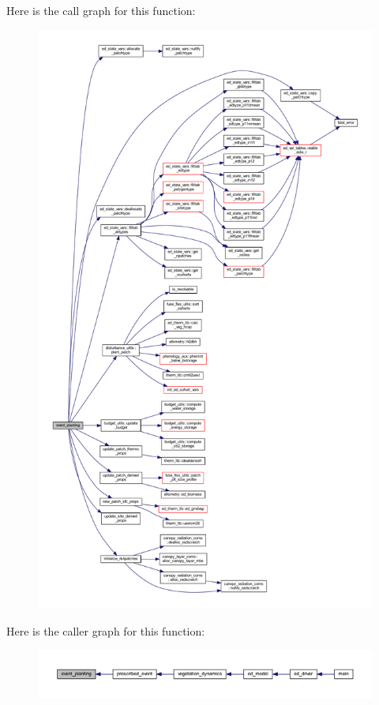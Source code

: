 Here is the call graph for this function\+:\nopagebreak
\begin{figure}[H]
\begin{center}
\leavevmode
\includegraphics[height=550pt]{events_8f90_a3fcb64b4de4ae9408c3e365f6cbd1be6_cgraph}
\end{center}
\end{figure}




Here is the caller graph for this function\+:\nopagebreak
\begin{figure}[H]
\begin{center}
\leavevmode
\includegraphics[width=350pt]{events_8f90_a3fcb64b4de4ae9408c3e365f6cbd1be6_icgraph}
\end{center}
\end{figure}


